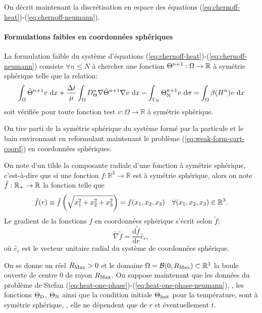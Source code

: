 On décrit maintenant la discrétisation en
espace des équations (\ref{eq:chernoff-heat})-(\ref{eq:chernoff-neumann}).

\paragraph{Formulations faibles en coordonnées sphériques}
La formulation faible du système d'équations
(\ref{eq:chernoff-heat})-(\ref{eq:chernoff-neumann}) consiste $\forall
n\leq N$ à chercher une fonction $\Theta^{n+1}:\Omega\to\mathbb R$
à symétrie sphérique telle que la relation:
\begin{equation}\label{eq:weak-form-cart-coord}
  \int_\Omega \hat\temperature^{n+1} v\,\intd{x} + \frac{\timestep}{\mu} %
  \int_\Omega \electrolytetdiff^n\nabla \hat\temperature^{n+1} \nabla v\,\intd{x} - %
  \int_{\Gamma_\mathrm{N}} \temperature^{n+1}_\mathrm{N} v\,\intd{\sigma} %
  = \int_\Omega \beta(\enthalpydensity^n)v\,\intd{x}
\end{equation}
soit vérifiée pour toute fonction test $v:\Omega\to\mathbb R$ à
symétrie sphérique.

On tire parti de la symétrie sphérique du système formé par la
particule et le bain environnant en reformulant maintenant le
problème (\ref{eq:weak-form-cart-coord}) en coordonnées sphériques.

On note d'un tilde la composante radiale d'une fonction à symétrie
sphérique, c'est-à-dire que si une fonction $f:\mathbb
R^3\to\mathbb R$ est à symétrie sphérique, alors on note $\tilde
f:\mathbb {{\mathbb R_+}}\to\mathbb R$ la fonction telle que
\begin{equation}\label{eq:spherical-symmetry}
  \tilde f(r) \equiv\tilde f\left( \sqrt{x_1^2 + x_2^2 + x_3^2} \right) = f(x_1, x_2,
  x_3)\quad \forall(x_1, x_2,x_3)\in\mathbb R^3.
\end{equation}
Le gradient de la fonctions $f$ en coordonnées sphérique s'écrit selon
$\tilde f$:
\begin{equation}\label{eq:spherical-gradient}
  \tilde\nabla\tilde f = \frac{\mathrm d\tilde f}{\mathrm dr}\hat e_r,
\end{equation}
où $\hat e_r$ est le vecteur unitaire radial du système de
coordonnées sphérique.

On se donne un réel $R_\mathrm{Max} > 0$ et le domaine $\Omega = \mathcal B(0,
R_\mathrm{Max}) \subset \mathbb R^3$ la boule ouverte de centre $0$ de rayon
$R_\mathrm{Max}$. On suppose maintenant que les données du problème de Stefan
(\ref{eq:heat-one-phase})-(\ref{eq:heat-one-phase-neumann}), \ie, les
fonctions $\Theta_\mathrm{D}$, $\Theta_\mathrm{N}$ ainsi
que la condition initiale $\Theta_\text{Init}$ pour la température, sont à
symétrie sphérique, \ie, elle ne dépendent que de $r$ et
éventuellement $t$.

